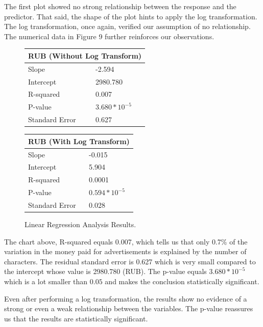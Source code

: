 \documentclass[12pt]{article}
\theoremstyle{definition}
\begin{document}
\bigskip

The first plot showed no strong relationship between the response and the
predictor. That said, the shape of the plot hints to apply the log
transformation. The log transformation, once again, verified our assumption
of no relationship. The numerical data in Figure 9 further reinforces our
observations.

\bigskip

\begin{figure}[H]
\begin{center}
\begin{tabular}{|p{3cm}|p{3cm}|}
 \hline
 \multicolumn{2}{|c|}{RUB (Without Log Transform)}\\
 \hline
 Slope          & -2.594\\
 \hline
 Intercept      & 2980.780\\
 \hline
 R-squared      & 0.007\\
 \hline
 P-value        & $3.680 * 10^{-5}$\\
 \hline
 Standard Error & 0.627\\
 \hline
\end{tabular}
\qquad
\begin{tabular}{|p{3cm}|p{3cm}|}
 \hline
 \multicolumn{2}{|c|}{RUB (With Log Transform)}\\
 \hline
 Slope          & -0.015\\
 \hline
 Intercept      & 5.904\\
 \hline
 R-squared      & 0.0001\\
 \hline
 P-value        & $0.594 * 10^{-5}$\\
 \hline
 Standard Error & 0.028\\
 \hline
\end{tabular}
\end{center}
\caption{Linear Regression Analysis Results.}
\end{figure}

\bigskip

The chart above, R-squared equals 0.007, which tells us that only 0.7\%
of the variation in the money paid for advertisements is explained by the
number of characters. The residual standard error is 0.627 which is very small
compared to the intercept whose value is 2980.780 (RUB). The p-value equals
$3.680 * 10^{-5}$ which is a lot smaller than $0.05$ and makes the conclusion
statistically significant.

\bigskip

Even after performing a log transformation, the results show no evidence of a
strong or even a weak relationship between the variables. The p-value reassures
us that the results are statistically significant.
\end{document}
